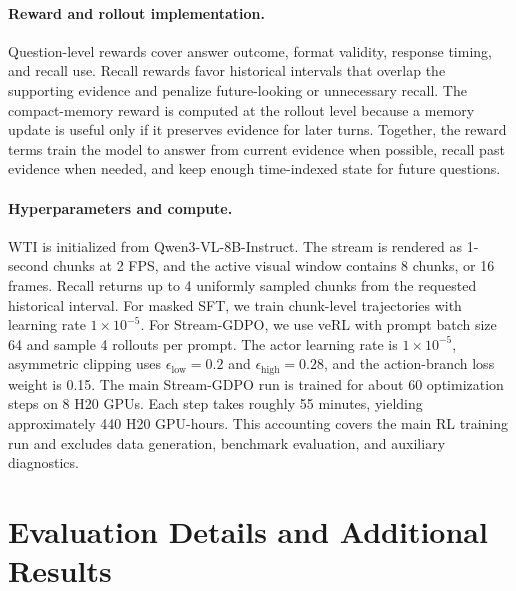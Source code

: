 \paragraph{Reward and rollout implementation.}
Question-level rewards cover answer outcome, format validity, response timing, and recall use.
Recall rewards favor historical intervals that overlap the supporting evidence and penalize future-looking or unnecessary recall.
The compact-memory reward is computed at the rollout level because a memory update is useful only if it preserves evidence for later turns.
Together, the reward terms train the model to answer from current evidence when possible, recall past evidence when needed, and keep enough time-indexed state for future questions.

\paragraph{Hyperparameters and compute.}
WTI is initialized from Qwen3-VL-8B-Instruct.
The stream is rendered as 1-second chunks at 2 FPS, and the active visual window contains 8 chunks, or 16 frames.
Recall returns up to 4 uniformly sampled chunks from the requested historical interval.
For masked SFT, we train chunk-level trajectories with learning rate \(1\times10^{-5}\).
For Stream-GDPO, we use veRL with prompt batch size 64 and sample 4 rollouts per prompt.
The actor learning rate is \(1\times10^{-5}\), asymmetric clipping uses \(\epsilon_{\mathrm{low}}=0.2\) and \(\epsilon_{\mathrm{high}}=0.28\), and the action-branch loss weight is 0.15.
The main Stream-GDPO run is trained for about 60 optimization steps on 8 H20 GPUs.
Each step takes roughly 55 minutes, yielding approximately 440 H20 GPU-hours.
This accounting covers the main RL training run and excludes data generation, benchmark evaluation, and auxiliary diagnostics.

\section{Evaluation Details and Additional Results}
\label{app:additional_tables}

\makeatletter
\setlength{\@dblfptop}{0pt}
\setlength{\@dblfpbot}{0pt plus 1fil}
\makeatother
\setlength{\textfloatsep}{8pt plus 2pt minus 2pt}
\setlength{\floatsep}{6pt plus 2pt minus 2pt}
\setlength{\dbltextfloatsep}{8pt plus 2pt minus 2pt}
\setlength{\dblfloatsep}{6pt plus 2pt minus 2pt}

